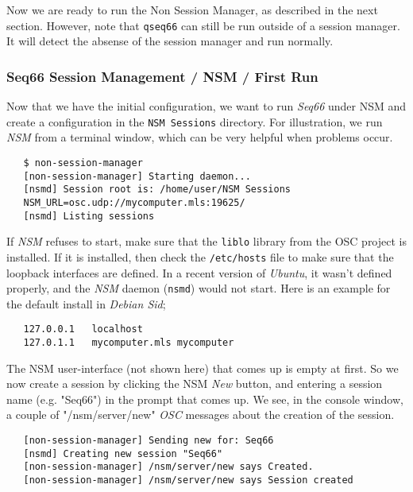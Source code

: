    Now we are ready to run the Non Session Manager, as described in the next
   section.
   However, note that \texttt{qseq66} can still be run outside of a
   session manager.  It will detect the absense of the session manager and run
   normally.

\subsubsection{Seq66 Session Management / NSM / First Run}
\label{subsec:sessions_nsm}

   Now that we have the initial configuration, we want to run \textsl{Seq66}
   under NSM and create a configuration in the \texttt{NSM Sessions} directory.
   For illustration, we run \textsl{NSM} from a terminal window, which can be
   very helpful when problems occur.

\begin{verbatim}
   $ non-session-manager
   [non-session-manager] Starting daemon...
   [nsmd] Session root is: /home/user/NSM Sessions
   NSM_URL=osc.udp://mycomputer.mls:19625/
   [nsmd] Listing sessions
\end{verbatim}

   If \textsl{NSM} refuses to start, make sure that the \texttt{liblo} library
   from the OSC project is installed.  If it is installed, then check the
   \texttt{/etc/hosts} file to make sure that the loopback interfaces are
   defined. In a recent version of \textsl{Ubuntu}, it wasn't defined properly,
   and the \textsl{NSM} daemon (\texttt{nsmd}) would not start.
   Here is an example for the default install in \textsl{Debian Sid};

\begin{verbatim}
   127.0.0.1   localhost
   127.0.1.1   mycomputer.mls mycomputer
\end{verbatim}

   The NSM user-interface (not shown here) that comes up is empty at first.  So
   we now create a session by clicking the NSM \textsl{New} button, and
   entering a session name (e.g. "Seq66") in the prompt that comes up.  We see,
   in the console window, a couple of "/nsm/server/new" \textsl{OSC} messages
   about the creation of the session.

\begin{verbatim}
   [non-session-manager] Sending new for: Seq66
   [nsmd] Creating new session "Seq66"
   [non-session-manager] /nsm/server/new says Created.
   [non-session-manager] /nsm/server/new says Session created
\end{verbatim}

